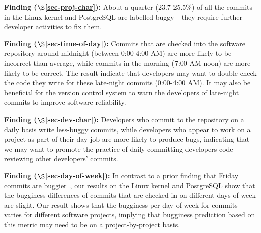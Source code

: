 \begin{list}{}{\topsep=0pt\parsep=0pt\leftmargin=9pt\itemindent=0pt}

\item {\bf Finding \fbuggy ($\S$\ref{sec-proj-char}):} 
About a quarter (23.7-25.5\%) of all the commits in the Linux kernel and
PostgreSQL are labelled buggy---they require further developer activities to fix
them.

\item {\bf Finding \fhour ($\S$\ref{sec-time-of-day}):} 
Commits that are checked into the software repository around midnight (between
0:00-4:00 AM) are more likely to be incorrect than average, while commits in the
morning (7:00 AM-noon) are more likely to be correct.  The result indicate that
developers may want to double check the code they write for these late-night
commits (0:00-4:00 AM).  It may also be beneficial for the version control
system to warn the developers of late-night commits to improve software
reliability.

\item {\bf Finding \fdaily ($\S$\ref{sec-dev-char}):} 
Developers who commit to the repository on a daily basis write less-buggy
commits, while developers who appear to work on a project as part of their
day-job are more likely to produce bugs, indicating that we may want to promote
the practice of daily-committing developers code-reviewing other developers'
commits.

\item {\bf Finding \fday ($\S$\ref{sec-day-of-week}):} 
In contrast to a prior finding that Friday commits are
buggier~\cite{sliwerski-msr-2005}, our results on the Linux kernel and
PostgreSQL show that the bugginess differences of commits that are checked in on
different days of week are slight. Our result shows that the bugginess per
day-of-week for commits varies for different software projects, implying that
bugginess prediction based on this metric may need to be on a project-by-project
basis.

\end{list}
